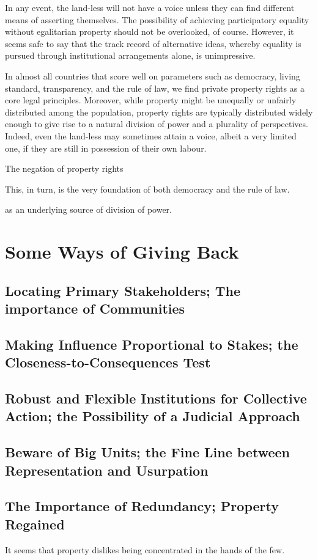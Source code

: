 {{In any event, the land-less will not have a voice unless they can find different means of asserting themselves. The possibility of achieving participatory equality without egalitarian property should not be overlooked, of course. However, it seems safe to say that the track record of alternative ideas, whereby equality is pursued through institutional arrangements alone, is unimpressive. 

In almost all countries that score well on parameters such as democracy, living standard, transparency, and the rule of law, we find private property rights as a core legal principles. Moreover, while property might be unequally or unfairly distributed among the population, property rights are typically distributed widely enough to give rise to a natural division of power and a plurality of perspectives. Indeed, even the land-less may sometimes attain a voice, albeit a very limited one, if they are still in possession of their own labour.

The negation of property rights

This, in turn, is the very foundation of both democracy and the rule of law.



 as an underlying source of division of power.


 
\section{Some Ways of Giving Back}

\subsection{Locating Primary Stakeholders; The importance of Communities}

\subsection{Making Influence Proportional to Stakes; the Closeness-to-Consequences Test}

\subsection{Robust and Flexible Institutions for Collective Action; the Possibility of a Judicial Approach}

\subsection{Beware of Big Units; the Fine Line between Representation and Usurpation}

\subsection{The Importance of Redundancy; Property Regained}

It seems that property dislikes being concentrated in the hands of the few. } }